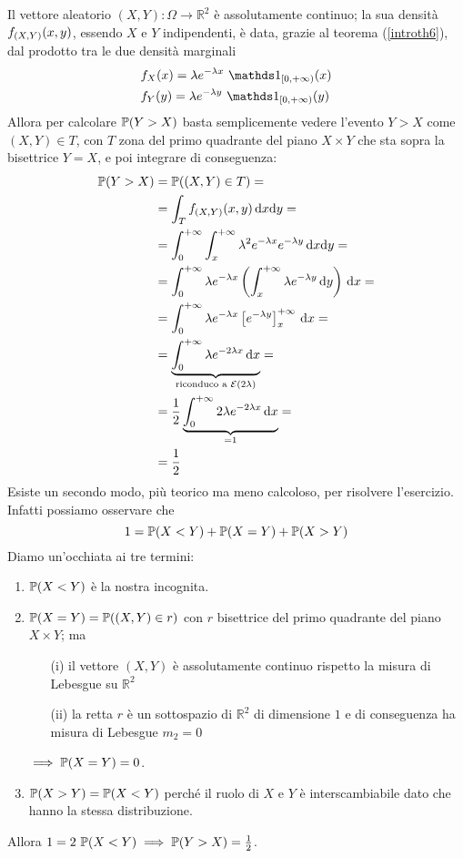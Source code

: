 \Soluzione{}
Il vettore aleatorio $(X,Y):\Omega\to\mathbb{R}^2$ è assolutamente continuo; la sua densità $f_{(X,Y)}(x,y)$, essendo $X$ e $Y$ indipendenti, è data, grazie al  teorema (\ref{introth6}), dal prodotto tra le due densità marginali
\begin{gather*}
\begin{aligned}
&f_X(x)=\lambda e^{-\lambda x}\ \Ind_{[0,+\infty)}(x) \\
&f_Y(y)=\lambda e^{-\lambda y}\ \Ind_{[0,+\infty)}(y)
\end{aligned}
\end{gather*}
Allora per calcolare $\mathbb{P}(Y>X)$ basta semplicemente vedere l'evento $Y>X$ come $(X,Y)\in T$, con $T$ zona del primo quadrante del piano $X\times Y$ che sta sopra la bisettrice $Y=X$, e poi integrare di conseguenza:
\begin{gather*}
\begin{aligned}
\mathbb{P}(Y>X)&=\mathbb{P}((X,Y)\in T)= \\
&=\int_T f_{(X,Y)}(x,y) \, \mathrm{d} x \mathrm{d} y= \\
&=\int_0^{+\infty} \int_{x}^{+\infty}\lambda^2e^{-\lambda x}e^{-\lambda y}\, \mathrm{d} x \mathrm{d} y= \\
&=\int_0^{+\infty}\lambda e^{-\lambda x} \left(\int_{x}^{+\infty} \lambda e^{-\lambda y}  \, \mathrm{d} y  \right)\, \mathrm{d} x= \\
&=\int_0^{+\infty}\lambda e^{-\lambda x} \left[ e^{-\lambda y}  \right]_x^{+\infty}\, \mathrm{d} x=\\
&=\underbrace{\int_0^{+\infty}\lambda e^{-2\lambda x}\, \mathrm{d} x}_{\text{riconduco a }\mathcal{E}(2\lambda)}=\\
&=\frac{1}{2}\underbrace{\int_0^{+\infty}2\lambda e^{-2\lambda x}\, \mathrm{d} x}_{=1}=\\
&=\frac{1}{2}
\end{aligned}
\end{gather*}
Esiste un secondo modo, più teorico ma meno calcoloso, per risolvere l'esercizio. Infatti possiamo osservare che
\begin{equation*}
1=\mathbb{P}(X<Y)+\mathbb{P}(X=Y)+\mathbb{P}(X>Y)
\end{equation*}
Diamo un'occhiata ai tre termini:
\begin{enumerate}
\item $\mathbb{P}(X<Y)$ è la nostra incognita.
\item $\mathbb{P}(X=Y)=\mathbb{P}((X,Y)\in r)$ con $r$ bisettrice del primo quadrante del piano $X\times Y$; ma
\begin{enumerate} 
\item [(i)] il vettore $(X,Y)$ è assolutamente continuo rispetto la misura di Lebesgue su $\mathbb{R}^2$
\item [(ii)] la retta $r$ è un sottospazio di $\mathbb{R}^2$ di dimensione $1$ e di conseguenza ha misura di Lebesgue $m_2=0$
\end{enumerate}
$\implies \mathbb{P}(X=Y)=0$.
\item $\mathbb{P}(X>Y)=\mathbb{P}(X<Y)$ perché il ruolo di $X$ e $Y$ è interscambiabile dato che hanno la stessa distribuzione.
\end{enumerate}
Allora $1=2\ \mathbb{P}(X<Y) \implies \mathbb{P}(Y>X)=\frac{1}{2}$.

